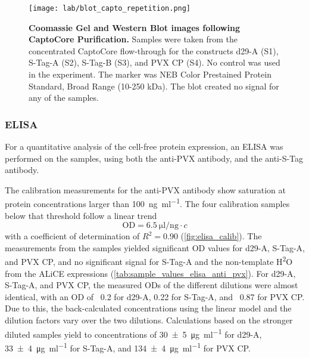 \begin{figure}
\texttt{[image: lab/blot\_capto\_repetition.png]}
\caption{\textbf{Coomassie Gel and Western Blot images following CaptoCore Purification.} Samples were taken from the concentrated CaptoCore flow-through for the constructs d29-A (S1), S-Tag-A (S2), S-Tag-B (S3), and PVX CP (S4). No control was used in the experiment. The marker was NEB Color Prestained Protein Standard, Broad Range (10-250 kDa). The blot created no signal for any of the samples. }
\label{fig:blot_capto_repetition}
\end{figure}


\label{subsection:elisa}
\subsubsection{ELISA}
For a quantitative analysis of the cell-free protein expression, an ELISA was performed on the samples, using both the anti-PVX antibody, and the anti-S-Tag antibody. 

The calibration measurements for the anti-PVX antibody show saturation at protein concentrations larger than \SI{100}{\nano\gram\per\milli\litre}. The four calibration samples below that threshold follow a linear trend 
\begin{equation}
\text{OD} = \SI{6.5}{\micro\litre\per\nano\gram} \cdot c
\end{equation}
with a coefficient of determination of $R^2=0.90$ (\autoref{fig:elisa_calib}). The measurements from the samples yielded significant OD values for d29-A, S-Tag-A, and PVX CP, and no significant signal for S-Tag-A and the non-template H\textsuperscript{2}O from the ALiCE expressions (\autoref{tab:sample_values_elisa_anti_pvx}). For d29-A, S-Tag-A, and PVX CP, the measured ODs of the different dilutions were almost identical, with an OD of ~0.2 for d29-A, 0.22 for S-Tag-A, and ~0.87 for PVX CP. Due to this, the back-calculated concentrations using the linear model and the dilution factors vary over the two dilutions. Calculations based on the stronger diluted samples yield to concentrations of \SI{30\pm 5}{\micro\gram\per\milli\litre} for d29-A, \SI{33\pm 4}{\micro\gram\per\milli\litre} for S-Tag-A, and \SI{134\pm 4}{\micro\gram\per\milli\litre} for PVX CP. 

